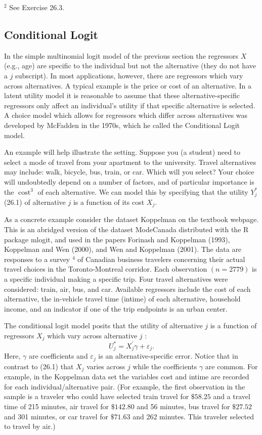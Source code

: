\documentclass[10pt]{article}
\begin{document}
${ }^{2}$ See Exercise 26.3.

\subsection{Conditional Logit}
In the simple multinomial logit model of the previous section the regressors $X$ (e.g., age) are specific to the individual but not the alternative (they do not have a $j$ subscript). In most applications, however, there are regressors which vary across alternatives. A typical example is the price or cost of an alternative. In a latent utility model it is reasonable to assume that these alternative-specific regressors only affect an individual's utility if that specific alternative is selected. A choice model which allows for regressors which differ across alternatives was developed by McFadden in the 1970s, which he called the Conditional Logit model.

An example will help illustrate the setting. Suppose you (a student) need to select a mode of travel from your apartment to the university. Travel alternatives may include: walk, bicycle, bus, train, or car. Which will you select? Your choice will undoubtedly depend on a number of factors, and of particular importance is the $\operatorname{cost}^{3}$ of each alternative. We can model this by specifying that the utility $Y_{j}^{*}$ (26.1) of alternative $j$ is a function of its cost $X_{j}$.

As a concrete example consider the dataset Koppelman on the textbook webpage. This is an abridged version of the dataset ModeCanada distributed with the R package mlogit, and used in the papers Forinash and Koppelman (1993), Koppelman and Wen (2000), and Wen and Koppelman (2001). The data are responses to a survey ${ }^{4}$ of Canadian business travelers concerning their actual travel choices in the Toronto-Montreal corridor. Each observation $(n=2779)$ is a specific individual making a specific trip. Four travel alternatives were considered: train, air, bus, and car. Available regressors include the cost of each alternative, the in-vehicle travel time (intime) of each alternative, household income, and an indicator if one of the trip endpoints is an urban center.

The conditional logit model posits that the utility of alternative $j$ is a function of regressors $X_{j}$ which vary across alternative $j$ :
$$
U_{j}^{*}=X_{j}^{\prime} \gamma+\varepsilon_{j} .
$$
Here, $\gamma$ are coefficients and $\varepsilon_{j}$ is an alternative-specific error. Notice that in contrast to (26.1) that $X_{j}$ varies across $j$ while the coefficients $\gamma$ are common. For example, in the Koppelman data set the variables cost and intime are recorded for each individual/alternative pair. (For example, the first observation in the sample is a traveler who could have selected train travel for $\$ 58.25$ and a travel time of 215 minutes, air travel for $\$ 142.80$ and 56 minutes, bus travel for $\$ 27.52$ and 301 minutes, or car travel for $\$ 71.63$ and 262 minutes. This traveler selected to travel by air.)
\end{document}
